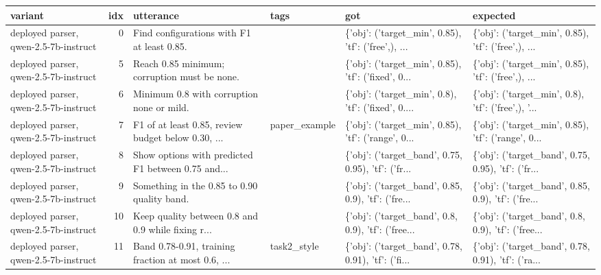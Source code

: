 \begin{tabular}{lrllll}
\toprule
                                          variant &  idx &                                          utterance &                   tags &                                                got &                                           expected \\
\midrule
            deployed parser, qwen-2.5-7b-instruct &    0 &         Find configurations with F1 at least 0.85. &                        & \{'obj': ('target\_min', 0.85), 'tf': ('free',), ... & \{'obj': ('target\_min', 0.85), 'tf': ('free',), ... \\
            deployed parser, qwen-2.5-7b-instruct &    5 &       Reach 0.85 minimum; corruption must be none. &                        & \{'obj': ('target\_min', 0.85), 'tf': ('fixed', 0... & \{'obj': ('target\_min', 0.85), 'tf': ('free',), ... \\
            deployed parser, qwen-2.5-7b-instruct &    6 &          Minimum 0.8 with corruption none or mild. &                        & \{'obj': ('target\_min', 0.8), 'tf': ('fixed', 0.... & \{'obj': ('target\_min', 0.8), 'tf': ('free',), '... \\
            deployed parser, qwen-2.5-7b-instruct &    7 & F1 of at least 0.85, review budget below 0.30, ... &          paper\_example & \{'obj': ('target\_min', 0.85), 'tf': ('range', 0... & \{'obj': ('target\_min', 0.85), 'tf': ('range', 0... \\
            deployed parser, qwen-2.5-7b-instruct &    8 & Show options with predicted F1 between 0.75 and... &                        & \{'obj': ('target\_band', 0.75, 0.95), 'tf': ('fr... & \{'obj': ('target\_band', 0.75, 0.95), 'tf': ('fr... \\
            deployed parser, qwen-2.5-7b-instruct &    9 &        Something in the 0.85 to 0.90 quality band. &                        & \{'obj': ('target\_band', 0.85, 0.9), 'tf': ('fre... & \{'obj': ('target\_band', 0.85, 0.9), 'tf': ('fre... \\
            deployed parser, qwen-2.5-7b-instruct &   10 & Keep quality between 0.8 and 0.9 while fixing r... &                        & \{'obj': ('target\_band', 0.8, 0.9), 'tf': ('free... & \{'obj': ('target\_band', 0.8, 0.9), 'tf': ('free... \\
            deployed parser, qwen-2.5-7b-instruct &   11 & Band 0.78-0.91, training fraction at most 0.6, ... &            task2\_style & \{'obj': ('target\_band', 0.78, 0.91), 'tf': ('fi... & \{'obj': ('target\_band', 0.78, 0.91), 'tf': ('ra... \\

\end{tabular}
